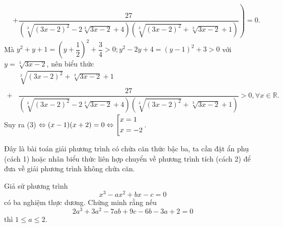 \begin{bt}
{$$\begin{aligned}
&\left.+\dfrac{27}{\left(\sqrt[3]{(3x-2)^2}-2\sqrt[3]{3x-2}+4\right)\left(\sqrt[3]{(3x-2)^2}+\sqrt[3]{3x-2}+1\right)}\right)=0.
\end{aligned}
$$
Mà $y^2+y+1=\left(y+\dfrac{1}{2}\right)^2+\dfrac{3}{4}>0; y^2-2y+4=(y-1)^2+3>0$ với $y=\sqrt[3]{3x-2}$, nên biểu thức {\allowdisplaybreaks
	\begin{align*}
	&\sqrt[3]{(3x-2)^2}+\sqrt[3]{3x-2}+1\\
	+&\dfrac{27}{\left(\sqrt[3]{(3x-2)^2}-2\sqrt[3]{3x-2}+4\right)\left(\sqrt[3]{(3x-2)^2}+\sqrt[3]{3x-2}+1\right)}>0,\forall x\in\mathbb{R}.
	\end{align*}}Suy ra (3) $\Leftrightarrow (x-1)(x+2)=0\Leftrightarrow\left[\begin{aligned}&x=1\\&x=-2\end{aligned}\right.$.
\begin{nx}
Đây là bài toán giải phương trình có chứa căn thức bậc ba, ta cần đặt ẩn phụ (cách 1) hoặc nhân biểu thức liên hợp chuyển về phương trình tích (cách 2) để đưa về giải phương trình không chứa căn.
\end{nx}
}
\end{bt}

\begin{bt}%
Giả sử phương trình \[x^3-ax^2+bx-c=0\] có ba nghiệm thực dương. Chứng minh rằng nếu \[2a^3+3a^2-7ab+9c-6b-3a+2=0\] thì $1\leq a\leq 2$.
\end{bt}

